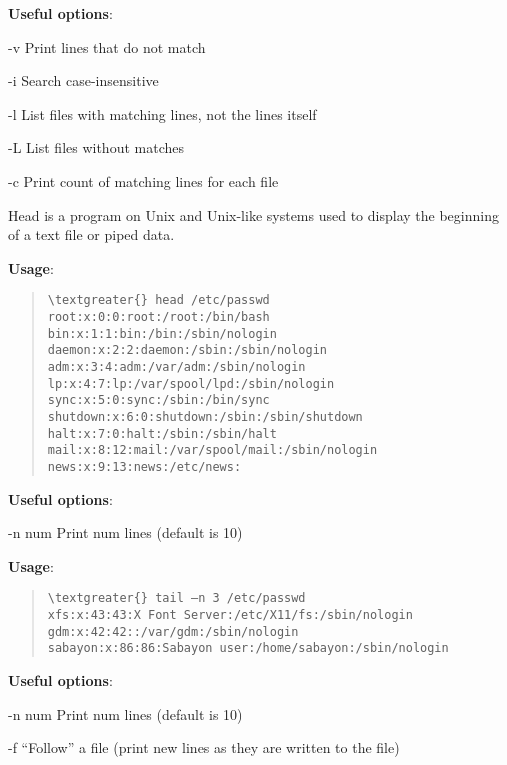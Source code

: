 \documentclass[letterpaper,10pt,english]{sphinxmanual}
\begin{document}
\textbf{Useful options}:
\begin{optionlist}{3cm}
\item [-v]  
Print lines that do not match
\item [-i]  
Search case-insensitive
\item [-l]  
List files with matching lines, not the lines itself
\item [-L]  
List files without matches
\item [-c]  
Print count of matching lines for each file
\end{optionlist}

Head is a program on Unix and Unix-like systems used to display the beginning of a text file or piped data.

\textbf{Usage}:  
\begin{quote}

\begin{Verbatim}[commandchars=\\\{\}]
\textgreater{} head /etc/passwd
root:x:0:0:root:/root:/bin/bash
bin:x:1:1:bin:/bin:/sbin/nologin
daemon:x:2:2:daemon:/sbin:/sbin/nologin
adm:x:3:4:adm:/var/adm:/sbin/nologin
lp:x:4:7:lp:/var/spool/lpd:/sbin/nologin
sync:x:5:0:sync:/sbin:/bin/sync
shutdown:x:6:0:shutdown:/sbin:/sbin/shutdown
halt:x:7:0:halt:/sbin:/sbin/halt
mail:x:8:12:mail:/var/spool/mail:/sbin/nologin
news:x:9:13:news:/etc/news:
\end{Verbatim}
\end{quote}

\textbf{Useful options}:
\begin{optionlist}{3cm}
\item [-n num]  
Print num lines (default is 10)
\end{optionlist}

\textbf{Usage}:  
\begin{quote}

\begin{Verbatim}[commandchars=\\\{\}]
\textgreater{} tail –n 3 /etc/passwd
xfs:x:43:43:X Font Server:/etc/X11/fs:/sbin/nologin
gdm:x:42:42::/var/gdm:/sbin/nologin
sabayon:x:86:86:Sabayon user:/home/sabayon:/sbin/nologin
\end{Verbatim}
\end{quote}

\textbf{Useful options}:
\begin{optionlist}{3cm}
\item [-n num]  
Print num lines (default is 10)
\item [-f]  
``Follow'' a file (print new lines as they are written to the file)
\end{optionlist}
\end{document}
